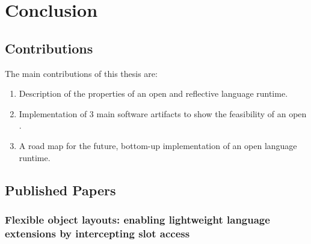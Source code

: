 

\chapter{Conclusion}
\minitoc


\section{Contributions}
The main contributions of this thesis are:
\begin{enumerate}
	\item Description of the properties of an open and reflective language runtime.
	\item Implementation of 3 main software artifacts to show the feasibility of an open \VM.
	\item A road map for the future, bottom-up implementation of an open language runtime.
\end{enumerate}


\section{Published Papers}
\subsection{Flexible object layouts: enabling lightweight language extensions by intercepting slot access}

